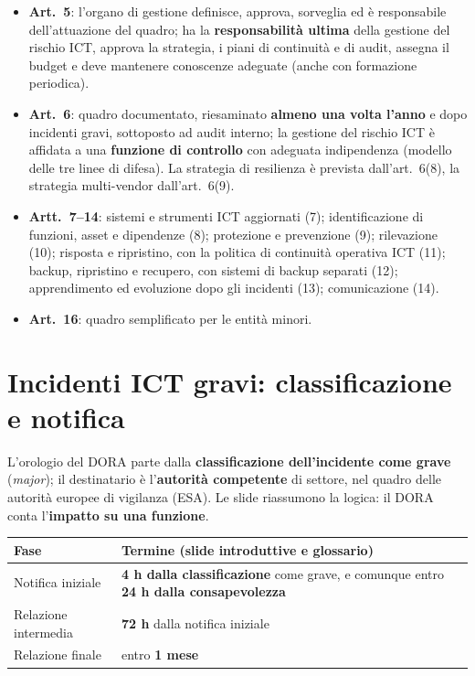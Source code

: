 \begin{integrazione}
\begin{itemize}
  \item \textbf{Art.~5}: l'organo di gestione definisce, approva, sorveglia ed è responsabile
    dell'attuazione del quadro; ha la \textbf{responsabilità ultima} della gestione del rischio ICT,
    approva la strategia, i piani di continuità e di audit, assegna il budget e deve mantenere
    conoscenze adeguate (anche con formazione periodica).
  \item \textbf{Art.~6}: quadro documentato, riesaminato \textbf{almeno una volta l'anno} e dopo
    incidenti gravi, sottoposto ad audit interno; la gestione del rischio ICT è affidata a una
    \textbf{funzione di controllo} con adeguata indipendenza (modello delle tre linee di difesa). La
    strategia di resilienza è prevista dall'art.~6(8), la strategia multi-vendor dall'art.~6(9).
  \item \textbf{Artt.~7--14}: sistemi e strumenti ICT aggiornati (7); identificazione di funzioni,
    asset e dipendenze (8); protezione e prevenzione (9); rilevazione (10); risposta e ripristino, con
    la politica di continuità operativa ICT (11); backup, ripristino e recupero, con sistemi di backup
    separati (12); apprendimento ed evoluzione dopo gli incidenti (13); comunicazione (14).
  \item \textbf{Art.~16}: quadro semplificato per le entità minori.
\end{itemize}
\end{integrazione}

\section{Incidenti ICT gravi: classificazione e notifica}
\label{sec:dora-incidenti}

L'orologio del DORA parte dalla \textbf{classificazione dell'incidente come grave} (\emph{major}); il
destinatario è l'\textbf{autorità competente} di settore, nel quadro delle autorità europee di
vigilanza (ESA). Le slide riassumono la logica: il DORA conta l'\textbf{impatto su una funzione}.

\begin{center}
\small
\begin{tabularx}{\linewidth}{>{\raggedright\arraybackslash}p{3.4cm} X}
\toprule
\textbf{Fase} & \textbf{Termine (slide introduttive e glossario)} \\ \midrule
Notifica iniziale & \textbf{4 h dalla classificazione} come grave, e comunque entro \textbf{24 h dalla
  consapevolezza} \\
Relazione intermedia & \textbf{72 h} dalla notifica iniziale \\
Relazione finale & entro \textbf{1 mese} \\
\bottomrule
\end{tabularx}
\end{center}

